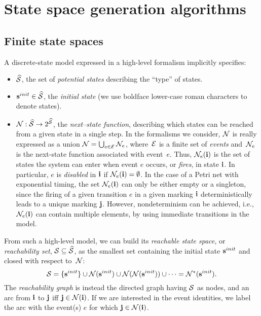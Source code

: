 %
%

\chapter{State space generation algorithms} \label{SEC:SSGen}

\section{Finite state spaces} \label{SEC:finite-state-spaces}

A discrete-state model expressed in a high-level formalism implicitly specifies:
\begin{itemize}
\item $\widehat{\mathcal{S}}$, the set of \emph{potential states} describing
the ``type'' of states.
\item $\mathbf{s}^{init} \in \widehat{\mathcal{S}}$, the \emph{initial state}
(we use boldface lower-case roman characters to denote states).
\item $\mathcal{N} : \widehat{\mathcal{S}} \rightarrow 2^{\widehat{\mathcal{S}}}$, the
\emph{next--state function}, describing which states can be reached from
a given state in a single step.
In the formalisms we consider, $\mathcal{N}$ is really expressed as a union
$\mathcal{N} = \bigcup_{e \in \mathcal{E}} \mathcal{N}_{e}$, where~$\mathcal{E}$ is a finite set
of \emph{events} and~$\mathcal{N}_{e}$ is the next-state function associated
with event~$e$.
Thus, $\mathcal{N}_{e}(\mathbf{i})$ is the set of states the system can enter when event $e$
occurs, or \emph{fires}, in state $\mathbf{i}$.
In particular, $e$ is \emph{disabled} in $\mathbf{i}$ if $\mathcal{N}_e(\mathbf{i}) = \emptyset$.
In the case of a Petri net with exponential timing, the set $\mathcal{N}_{e}(\mathbf{i})$
can only be either empty or a singleton, since the firing of
a given transition $e$ in a given marking $\mathbf{i}$
deterministically leads to a unique marking $\mathbf{j}$.
However, nondeterminism can be achieved, i.e., $\mathcal{N}_{e}(\mathbf{i})$ can contain
multiple elements, by using immediate transitions in the model.
\end{itemize} 

From such a high-level model, we can build its
\emph{reachable state space}, or \emph{reachability set},
$\mathcal{S} \subseteq \widehat{\mathcal{S}}$, as
the smallest set containing the initial state $\mathbf{s}^{init}$ and
closed with respect to~$\mathcal{N}$:
$$
   \mathcal{S} = \{\mathbf{s}^{init}\} \cup \mathcal{N}(\mathbf{s}^{init}) \cup
   \mathcal{N}(\mathcal{N}(\mathbf{s}^{init})) \cup \cdots = \mathcal{N}^{\ast}(\mathbf{s}^{init}).
$$
The \emph{reachability graph} is instead the directed graph having $\mathcal{S}$
as nodes, and an arc from $\mathbf{i}$ to $\mathbf{j}$ iff $\mathbf{j} \in \mathcal{N}(\mathbf{i})$.
If we are interested in the event identities, we label the arc
with the event(s) $e$ for which $\mathbf{j} \in \mathcal{N}(\mathbf{i})$.


